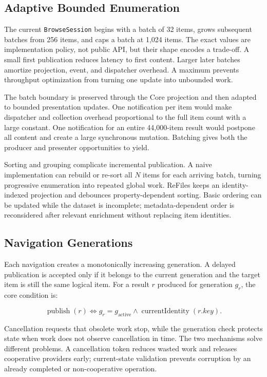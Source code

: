\documentclass[10pt,a4paper,twoside]{article}
\begin{document}
\subsection{Adaptive Bounded Enumeration}

The current \texttt{BrowseSession} begins with a batch of 32 items, grows subsequent batches from 256 items, and
caps a batch at 1,024 items. The exact values are implementation policy, not public API, but their shape encodes a
trade-off. A small first publication reduces latency to first content. Larger later batches amortize projection,
event, and dispatcher overhead. A maximum prevents throughput optimization from turning one update into
unbounded work.

The batch boundary is preserved through the Core projection and then adapted to bounded presentation updates.
One notification per item would make dispatcher and collection overhead proportional to the full item count
with a large constant. One notification for an entire 44,000-item result would postpone all content and create a
large synchronous mutation. Batching gives both the producer and presenter opportunities to yield.

Sorting and grouping complicate incremental publication. A naive implementation can rebuild or re-sort all
$N$ items for each arriving batch, turning progressive enumeration into repeated global work. ReFiles keeps an
identity-indexed projection and debounces property-dependent sorting. Basic ordering can be updated while the
dataset is incomplete; metadata-dependent order is reconsidered after relevant enrichment without replacing
item identities.

\subsection{Navigation Generations}

Each navigation creates a monotonically increasing generation. A delayed publication is accepted only if it
belongs to the current generation and the target item is still the same logical item. For a result $r$ produced
for generation $g_r$, the core condition is:

\[
  \operatorname{publish}(r) \iff g_r = g_{\mathrm{active}}
  \land \operatorname{currentIdentity}(r.key).
\]

Cancellation requests that obsolete work stop, while the generation check protects state when work does not
observe cancellation in time. The two mechanisms solve different problems. A cancellation token reduces wasted
work and releases cooperative providers early; current-state validation prevents corruption by an already
completed or non-cooperative operation.
\end{document}
